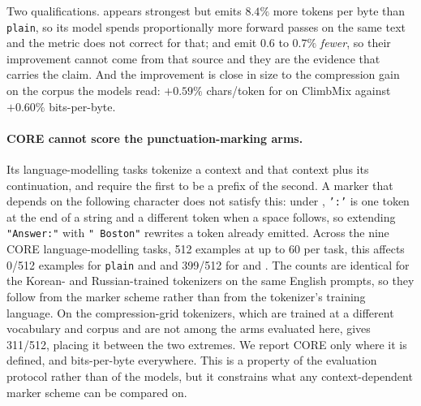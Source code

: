 Two qualifications.  appears strongest but emits $8.4\%$ more tokens per byte than
\texttt{plain}, so its model spends proportionally more forward passes on the same text and
the metric does not correct for that;  and  emit $0.6$ to $0.7\%$
\emph{fewer}, so their improvement cannot come from that source and they are the evidence
that carries the claim. And the improvement is close in size to the compression gain on the
corpus the models read: $+0.59\%$ chars/token for  on ClimbMix against $+0.60\%$
bits-per-byte.

\paragraph{CORE cannot score the punctuation-marking arms.} Its language-modelling tasks
tokenize a context and that context plus its continuation, and require the first to be a
prefix of the second. A marker that depends on the following character does not satisfy this:
under , \texttt{':'} is one token at the end of a string and a different token when a
space follows, so extending \texttt{"Answer:"} with \texttt{" Boston"} rewrites a token
already emitted. Across the nine CORE language-modelling tasks, 512 examples at up to 60 per
task, this affects 0/512 examples for \texttt{plain} and  and 399/512 for 
and . The counts are identical for the Korean- and Russian-trained tokenizers
on the same English prompts, so they follow from the marker scheme rather than from the
tokenizer's training language. On the compression-grid tokenizers, which are trained at a
different vocabulary and corpus and are not among the arms evaluated here,  gives
311/512, placing it between the two extremes. We report CORE
only where it is defined, and bits-per-byte everywhere. This is a property of the evaluation
protocol rather than of the models, but it constrains what any context-dependent marker scheme
can be compared on.
